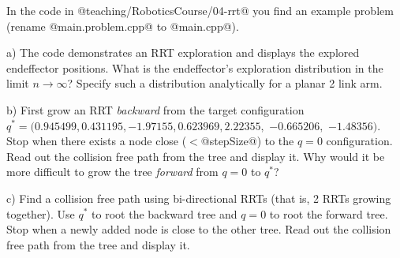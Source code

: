 

\renewcommand{\course}{Robotics}
\renewcommand{\coursepicture}{roboticsLecture}
\renewcommand{\coursedate}{Winter 2014}
\renewcommand{\exnum}{7}

\exercises


\exercisestitle




In the code in @teaching/RoboticsCourse/04-rrt@
you find an example problem (rename @main.problem.cpp@ to @main.cpp@).

a) The code demonstrates an RRT exploration and displays the explored
endeffector positions. What is the endeffector's exploration
distribution in the limit $n\to\infty$? Specify such a distribution
analytically for a planar 2 link arm.

b) First grow an RRT \emph{backward} from the target configuration
$q^*=(0.945499, 0.431195, -1.97155, 0.623969, 2.22355,$ $-0.665206,$
$-1.48356)$. Stop when there
exists a node close ($<$@stepSize@) to the $q=0$ configuration. Read
out the collision free path from the tree and display it. Why would it
be more difficult to grow the tree \emph{forward} from $q=0$ to $q^*$?

c) Find a collision free path using bi-directional RRTs (that is, 2
RRTs growing together). Use $q^*$ to root the backward tree and $q=0$
to root the forward tree. Stop when a newly added node is close to the
other tree. Read out the collision free path from the tree and
display it.


